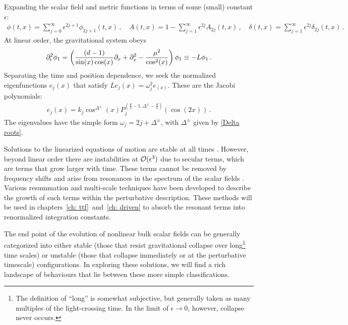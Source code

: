 \documentclass[../PhD.tex]{subfiles}
\begin{document}
Expanding the scalar field and metric functions in terms of some (small) constant $\epsilon$:
\begin{align}
\label{epsilon exp}
\phi(t,x) = \sum_{j=0}^{\infty} \epsilon^{2j + 1} \phi_{2j + 1} (t,x) \, , \quad A(t,x) = 1 - \sum_{j=1}^\infty \epsilon^{2j} A_{2j} (t,x) \, , \quad \delta(t,x) = \sum_{j=1}^\infty \epsilon^{2j} \delta_{2j} (t,x) \, .
\end{align}
At linear order, the gravitational system obeys
\begin{align}
\label{collapse eigen eqn}
\partial_t^2 \phi_1 = \left( \frac{ (d-1)}{\sin (x) \cos (x)} \partial_x + \partial^2_x - \frac{\mu^2}{\cos^2 (x)} \right) \phi_1 \equiv - L \phi_1 \, .
\end{align}
Separating the time and position dependence, we seek the normalized eigenfunctions $e_j(x)$ that satisfy $L e_j(x) = \omega_j^2 e_(x)$. These are the Jacobi polynomials:
\begin{align}
\label{scalar eigens}
e_j (x) = k_j \cos^{\Delta^\pm}(x) P_j^{(\frac{d}{2} - 1, \Delta^\pm - \frac{d}{2})} \left( \cos \left( 2x \right)\right) \, .
\end{align}
The eigenvalues have the simple form $\omega_j = 2j + \Delta^\pm$, with $\Delta^\pm$ given by \eqref{Delta roots}. 

Solutions to the linearized equations of motion are stable at all times \cite{1506.07907}. However, beyond linear order there are instabilities at $\mathcal O(\epsilon^3)$ due to secular terms, which are terms that grow larger with time. These terms cannot be removed by frequency shifts and arise from resonances in the spectrum of the scalar fields \cite{1407.6273}. Various resummation \cite{hep-th/9506161} and multi-scale techniques \cite{1403.6471} have been developed to describe the growth of such terms within the perturbative description. These methods will be used in chapters~\ref{ch: ttf}~and~\ref{ch: driven} to absorb the resonant terms into renormalized integration constants.

The end point of the evolution of nonlinear bulk scalar fields can be generally categorized into either stable (those that resist gravitational collapse over long\footnote{The definition of ``long'' is somewhat subjective, but generally taken as many multiples of the light-crossing time. In the limit of $\epsilon \to 0$, however, collapse never occurs.} time scales) or unstable (those that collapse immediately or at the perturbative timescale) configurations. In exploring these solutions, we will find a rich landscape of behaviours that lie between these more simple classifications.
\end{document}
